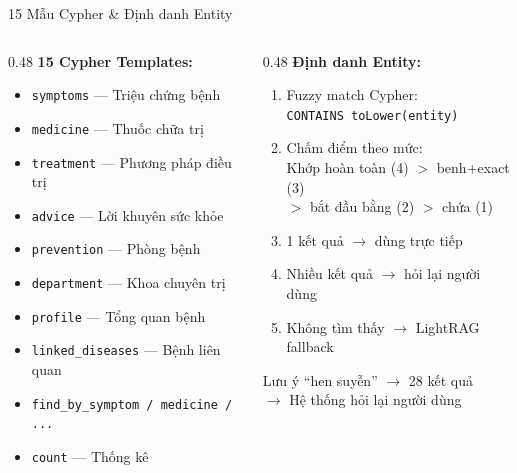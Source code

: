 \documentclass[aspectratio=169, 11pt]{beamer}
\begin{document}
\begin{frame}{15 Mẫu Cypher \& Định danh Entity}
  \begin{columns}[t]
    \begin{column}{0.48\textwidth}
      \textbf{15 Cypher Templates:}
      \begin{itemize}
        \scriptsize
        \item \texttt{symptoms} --- Triệu chứng bệnh
        \item \texttt{medicine} --- Thuốc chữa trị
        \item \texttt{treatment} --- Phương pháp điều trị
        \item \texttt{advice} --- Lời khuyên sức khỏe
        \item \texttt{prevention} --- Phòng bệnh
        \item \texttt{department} --- Khoa chuyên trị
        \item \texttt{profile} --- Tổng quan bệnh
        \item \texttt{linked\_diseases} --- Bệnh liên quan
        \item \texttt{find\_by\_symptom / medicine / ...}
        \item \texttt{count} --- Thống kê
      \end{itemize}
    \end{column}
    \begin{column}{0.48\textwidth}
      \textbf{Định danh Entity:}
      \begin{enumerate}
        \scriptsize
        \item Fuzzy match Cypher:\\
          \texttt{CONTAINS toLower(entity)}
        \item Chấm điểm theo mức:\\
          Khớp hoàn toàn (4) $>$ benh+exact (3)\\
          $>$ bắt đầu bằng (2) $>$ chứa (1)
        \item 1 kết quả $\to$ dùng trực tiếp
        \item Nhiều kết quả $\to$ hỏi lại người dùng
        \item Không tìm thấy $\to$ LightRAG fallback
      \end{enumerate}
      \vspace{0.3em}
      \begin{alertblock}{Lưu ý}
        \scriptsize ``hen suyễn'' $\to$ 28 kết quả\\
        $\to$ Hệ thống hỏi lại người dùng
      \end{alertblock}
    \end{column}
  \end{columns}
\end{frame}
\end{document}
